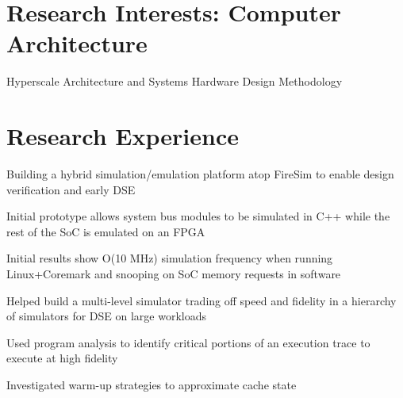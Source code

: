 \documentclass[]{deedy-resume-openfont}
\begin{document}
\section{Research Interests: Computer Architecture}
Hyperscale Architecture and Systems 
\textbullet{}
Hardware Design Methodology
\sectionsep

\section{Research Experience}



\vspace{\topsep} %

{\normalsize
\begin{tightemize}
\item Building a hybrid simulation/emulation platform atop FireSim to enable design verification and early DSE 
\item Initial prototype allows system bus modules to be simulated in C++ while the rest of the SoC is emulated on an FPGA
\item Initial results show O(10 MHz) simulation frequency when running Linux+Coremark and snooping on SoC memory requests in software 
\end{tightemize}
}

{\normalsize
\begin{tightemize}
\item Helped build a multi-level simulator trading off speed and fidelity in a hierarchy of simulators for DSE on large workloads
\item Used program analysis to identify critical portions of an execution trace to execute at high fidelity
\item Investigated warm-up strategies to approximate cache state 
\end{tightemize}
}
\end{document}
